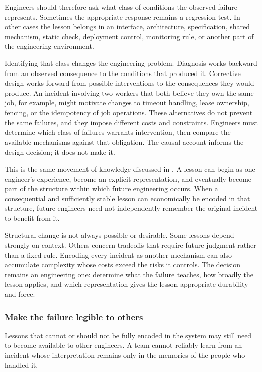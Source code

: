 Engineers should therefore ask what class of conditions the observed failure represents. Sometimes
the appropriate response remains a regression test. In other cases the lesson belongs in an
interface, architecture, specification, shared mechanism, static check, deployment control,
monitoring rule, or another part of the engineering environment.

Identifying that class changes the engineering problem. Diagnosis works backward from an observed
consequence to the conditions that produced it. Corrective design works forward from possible
interventions to the consequences they would produce. An incident involving two workers that both
believe they own the same job, for example, might motivate changes to timeout handling, lease
ownership, fencing, or the idempotency of job operations. These alternatives do not prevent the same
failures, and they impose different costs and constraints. Engineers must determine which class of
failures warrants intervention, then compare the available mechanisms against that obligation. The
causal account informs the design decision; it does not make it.

This is the same movement of knowledge discussed in \citet{ch-engineering-knowledge}. A lesson can begin
as one engineer's experience, become an explicit representation, and eventually become part of the
structure within which future engineering occurs. When a consequential and sufficiently stable
lesson can economically be encoded in that structure, future engineers need not independently
remember the original incident to benefit from it.

Structural change is not always possible or desirable. Some lessons depend strongly on context.
Others concern tradeoffs that require future judgment rather than a fixed rule. Encoding every
incident as another mechanism can also accumulate complexity whose costs exceed the risks it
controls. The decision remains an engineering one: determine what the failure teaches, how broadly
the lesson applies, and which representation gives the lesson appropriate durability and force.

\subsubsection{Make the failure legible to others}\label{sec-failure-legible}

Lessons that cannot or should not be fully encoded in the system may still need to become available
to other engineers. A team cannot reliably learn from an incident whose interpretation remains only
in the memories of the people who handled it.

